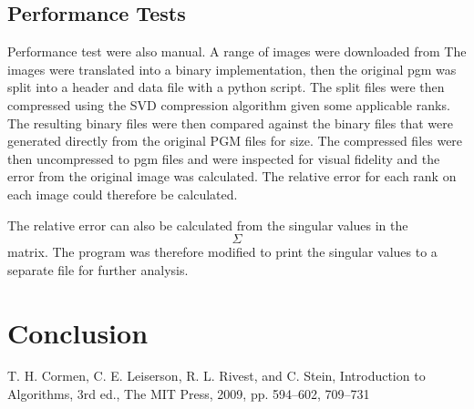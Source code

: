 \documentclass[conference]{IEEEtran}
\begin{document}
\subsection{Performance Tests}\label{perf_explanation} %
Performance test were also manual. A range of images were downloaded from %
The images were translated into a binary implementation, then the original pgm was split 
into a header and data file with a python script. The split files were then compressed 
using the SVD compression algorithm given some applicable ranks. The resulting binary 
files were then compared against the binary files that were generated directly from the 
original PGM files for size. The compressed files were then uncompressed to pgm files 
and were inspected for visual fidelity and the error from the original image was 
calculated. The relative error for each rank on each image could therefore be calculated.

The relative error can also be calculated from the singular values in the $$\Sigma$$ matrix.
The program was therefore modified to print the singular values to a separate file for further
analysis.


\section{Conclusion}


\begin{thebibliography}{00}
     T. H. Cormen, C. E. Leiserson, R. L. Rivest, and C. Stein, Introduction to Algorithms, 3rd ed., The MIT Press, 2009, pp. 594--602, 709--731 
\end{thebibliography}
\end{document}
